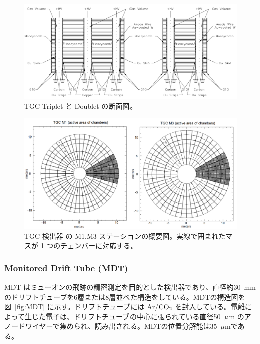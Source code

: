 \begin{figure}[tb]
  \centering
  \includegraphics[clip, width=13cm]{fig/2/TGC_construction.pdf}
  \caption{TGC Triplet と Doublet の断面図\cite{Aad:1129811}。}
  \label{fig:TGC}
\end{figure}

\begin{figure}[tb]
  \centering
  \includegraphics[clip, width=14cm]{fig/2/TGC_octant.png}
  \caption{TGC 検出器 の M1,M3 ステーションの概要図\cite{Lellouch:684103}。実線で囲まれたマスが 1 つのチェンバーに対応する。}
  \label{fig:TGC_oc}
\end{figure}

\subsubsection{Monitored Drift Tube (MDT)}
MDT はミューオンの飛跡の精密測定を目的とした検出器であり、直径約30~mmのドリフトチューブを6層または8層並べた構造をしている。MDTの構造図を図~\ref{fig:MDT} に示す。ドリフトチューブには Ar/$\rm{CO_2}$ を封入している。電離によって生じた電子は、ドリフトチューブの中心に張られている直径50~$\rm{\mu}$m のアノードワイヤーで集められ、読み出される。MDTの位置分解能は35~$\mu$mである。

